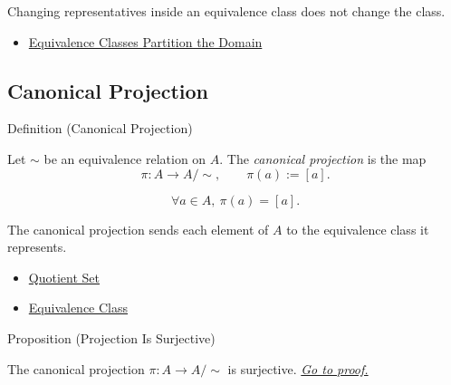 \begin{remark*}[Interpretation]
Changing representatives inside an equivalence class does not change the
class.
\end{remark*}

\begin{dependencies}
\begin{itemize}
  \item \hyperref[thm:equivalence-classes-partition-domain]{Equivalence Classes Partition the Domain}
\end{itemize}
\end{dependencies}

\subsection*{Canonical Projection}

\begin{definitionbox}{Definition (Canonical Projection)}
\begin{definition}
\label{def:canonical-projection}
Let $\sim$ be an equivalence relation on $A$. The \emph{canonical projection}
is the map
\[
\pi:A\to A/{\sim},
\qquad
\pi(a):=[a].
\]
\end{definition}
\end{definitionbox}

\begin{remark*}
\[
\forall a\in A,\ \pi(a)=[a].
\]
\end{remark*}

\begin{remark*}[Interpretation]
The canonical projection sends each element of $A$ to the equivalence class it
represents.
\end{remark*}

\begin{dependencies}
\begin{itemize}
  \item \hyperref[def:quotient-set]{Quotient Set}
  \item \hyperref[def:equivalence-class]{Equivalence Class}
\end{itemize}
\end{dependencies}

\begin{propositionbox}{Proposition (Projection Is Surjective)}
\begin{proposition}
\label{prop:projection-is-surjective}
The canonical projection $\pi:A\to A/{\sim}$ is surjective.
\hyperref[prf:projection-is-surjective]{\textit{Go to proof.}}
\end{proposition}
\end{propositionbox}

